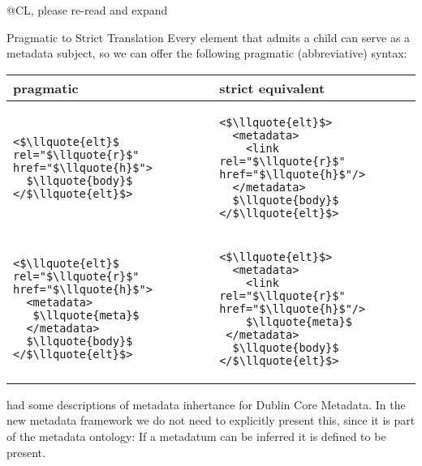 \begin{module}[id=genmeta]
\begin{omgroup}[creators={miko,clange},short={Metadata},id=metadatachap]
\begin{newpart}{@CL, please re-read and expand}
\begin{omgroup}{Pragmatic to Strict Translation}
  Every {\omdoc} element that admits a {} child can serve as a metadata
  subject, so we can offer the following pragmatic (abbreviative) syntax:
\begin{center}\lstset{frame=none,numbers=none,lineskip=-.7ex,aboveskip=-.5em,belowskip=-1em,mathescape}
 \begin{tabular}{|p{5cm}|p{5cm}|}\hline
    pragmatic & strict equivalent\\\hline
\begin{lstlisting}
<$\llquote{elt}$ rel="$\llquote{r}$" href="$\llquote{h}$">
  $\llquote{body}$
</$\llquote{elt}$>
\end{lstlisting}
&
\begin{lstlisting}
<$\llquote{elt}$>
  <metadata>
    <link rel="$\llquote{r}$" href="$\llquote{h}$"/>
  </metadata>
  $\llquote{body}$
</$\llquote{elt}$>
\end{lstlisting}
\\\hline 
\begin{lstlisting}
<$\llquote{elt}$ rel="$\llquote{r}$" href="$\llquote{h}$">
  <metadata>
   $\llquote{meta}$
  </metadata>
  $\llquote{body}$
</$\llquote{elt}$>
\end{lstlisting}
&
\begin{lstlisting}
<$\llquote{elt}$>
  <metadata>
    <link rel="$\llquote{r}$" href="$\llquote{h}$"/>
    $\llquote{meta}$
 </metadata>
  $\llquote{body}$
</$\llquote{elt}$>
\end{lstlisting}
\\\hline 
\end{tabular}
\end{center}
\end{omgroup}


{} had some descriptions of metadata inhertance for Dublin Core Metadata. In
the new metadata framework we do not need to explicitly present this, since it is part of
the metadata ontology: If a metadatum can be inferred it is defined to be
present. 
\end{newpart}
\end{omgroup}
\end{module}


